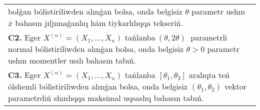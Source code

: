 \documentclass{article}
\begin{document}
\begin{tabular}{m{17cm}}
bolǵan bólistiriliwden alınǵan bolsa, onda belgisiz \(\theta\) parametr ushın \(\overline{x}\) bahasın jıljımaǵanlıq hám tiykarlılıqqa tekseriń.
 \\
\textbf{C2.} 
Eger \(X^{(n)} = \left( X_{1},...,X_{n} \right)\) tańlanba\(\ (\theta,2\theta)\ \) parametrli normal bólistiriliwden alınǵan bolsa, onda belgisiz \(\theta > 0\) parametr ushın momentler usılı bahasın tabıń.
 \\
\textbf{C3.} 
Eger \(X^{(n)} = \left( X_{1},...,X_{n} \right)\) tańlanba \(\left\lbrack \theta_{1},\theta_{2} \right\rbrack\) aralıqta teń ólshemli bólistiriliwden alınǵan bolsa, onda belgisiz \(\left( \theta_{1},\theta_{2} \right)\) vektor parametrdiń shınlıqqa maksimal uqsaslıq bahasın tabıń.
 \\

\end{tabular}
\vspace{1cm}
\end{document}
